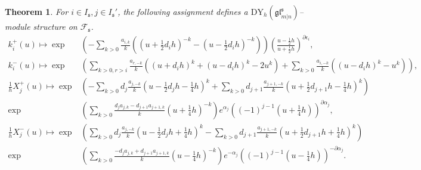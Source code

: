 \documentclass[a4paper,12pt]{article}
\newtheorem{theo}{{Theorem}}[section]
\numberwithin{equation}{section}
\begin{document}
\begin{theo}
For $i \in I_{\mathfrak{s}}, j \in I_{\mathfrak{s}}'$, the following assignment defines a $\mathrm{DY}_{h}(\mathfrak{gl}^{\mathfrak{s}}_{m|n})$--module structure on $\mathcal{F}_{\mathfrak{s}}$. 
\begin{align*}
k_{i}^{+}(u)\mapsto \exp &\left(-\sum_{k>0}\frac{a_{i,k}}{k}\left(\left(u+
\frac{1}{2}d_{i}h\right)^{-k}-\left(u-\frac{1}{2}d_{i}h\right)^{-k}\right)\right)
\left(\frac{u-\frac{1}{2}h}{u+\frac{1}{2}h}\right)^{\partial \epsilon_{i}},\\
k_{i}^{-}(u)\mapsto \exp &\left(\sum_{k>0,r>i}\frac{a_{r,-k}}{k}\left(\left(u+d_{i}h\right)^{k}+\left(u-d_{i}h\right)^{k}-2u^{k}\right)+\sum_{k>0}\frac{a_{i,-k}}{k}\left(\left(u-d_{i}h\right)^{k}-u^{k}\right)\right),\\
\frac{1}{h}X_{j}^{+}(u) \mapsto \exp &\left(-\sum_{k>0}d_{j} \frac{a_{j,-k}}{k}\left(u-\frac{1}{2}d_{j}h-\frac{1}{4}h\right)^{k}+\sum_{k>0}d_{j+1}\frac{a_{j+1,-k}}{k}\left(u+\frac{1}{2}d_{j+1}h
-\frac{1}{4}h\right)^{k}\right)\\
\exp &\left(\sum_{k>0}\frac{d_{j}a_{j,k}-d_{j+1}a_{j+1,k}}{k}
\left(u+\frac{1}{4}h\right)^{-k}\right)e^{\alpha_{j}}\left((-1)^{j-1}
\left(u+\frac{1}{4}h\right)\right)^{\partial \alpha_{j}},\\
\frac{1}{h}X_{j}^{-}(u)\mapsto \exp &\left(\sum_{k>0}d_{j}
\frac{a_{j,-k}}{k}\left(u-\frac{1}{2}d_{j}h+\frac{1}{4}h\right)^{k}-\sum_{k>0}d_{j+1}\frac{a_{j+1,-k}}{k}\left(u+\frac{1}{2}d_{j+1}h
+\frac{1}{4}h\right)^{k}\right)\\
\exp &\left(\sum_{k>0}\frac{-d_{j}a_{j,k}+d_{j+1}a_{j+1,k}}{k}
\left(u-\frac{1}{4}h\right)^{-k}\right)e^{-\alpha_{j}}\left((-1)^{j-1}
\left(u-\frac{1}{4}h\right)\right)^{-\partial \alpha_{j}}.
\end{align*}
\end{theo}
\end{document}
